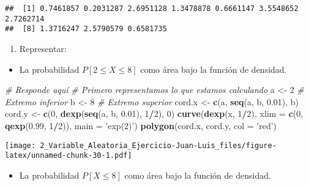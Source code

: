 \documentclass[
]{article}
\newenvironment{Shaded}{\begin{snugshade}}{\end{snugshade}}
\newcommand{\CommentTok}[1]{\textcolor[rgb]{0.56,0.35,0.01}{\textit{#1}}}
\newcommand{\DataTypeTok}[1]{\textcolor[rgb]{0.13,0.29,0.53}{#1}}
\newcommand{\DecValTok}[1]{\textcolor[rgb]{0.00,0.00,0.81}{#1}}
\newcommand{\FloatTok}[1]{\textcolor[rgb]{0.00,0.00,0.81}{#1}}
\newcommand{\KeywordTok}[1]{\textcolor[rgb]{0.13,0.29,0.53}{\textbf{#1}}}
\newcommand{\NormalTok}[1]{#1}
\newcommand{\OperatorTok}[1]{\textcolor[rgb]{0.81,0.36,0.00}{\textbf{#1}}}
\newcommand{\StringTok}[1]{\textcolor[rgb]{0.31,0.60,0.02}{#1}}
\providecommand{\tightlist}{%
  \setlength{\itemsep}{0pt}\setlength{\parskip}{0pt}}
\begin{document}
\begin{verbatim}
##  [1] 0.7461857 0.2031287 2.6951128 1.3478878 0.6661147 3.5548652 2.7262714
##  [8] 1.3716247 2.5790579 0.6581735
\end{verbatim}

\begin{enumerate}
\def\labelenumi{\arabic{enumi}.}
\setcounter{enumi}{3}
\tightlist
\item
  Representar:
\end{enumerate}

\begin{itemize}
\tightlist
\item
  La probabilidad \(P [2 \leq X \leq 8]\) como área bajo la función de
  densidad.
\end{itemize}

\begin{Shaded}
\begin{Highlighting}[]
\CommentTok{# Responde aquí}
\CommentTok{# Primero representamos lo que estamos calculando}
\NormalTok{a <-}\StringTok{ }\DecValTok{2} \CommentTok{# Extremo inferior}
\NormalTok{b <-}\StringTok{ }\DecValTok{8} \CommentTok{# Extremo superior}
\NormalTok{cord.x <-}\StringTok{ }\KeywordTok{c}\NormalTok{(a, }\KeywordTok{seq}\NormalTok{(a, b, }\FloatTok{0.01}\NormalTok{), b) }
\NormalTok{cord.y <-}\StringTok{ }\KeywordTok{c}\NormalTok{(}\DecValTok{0}\NormalTok{, }\KeywordTok{dexp}\NormalTok{(}\KeywordTok{seq}\NormalTok{(a, b, }\FloatTok{0.01}\NormalTok{), }\DecValTok{1}\OperatorTok{/}\DecValTok{2}\NormalTok{), }\DecValTok{0}\NormalTok{) }
\KeywordTok{curve}\NormalTok{(}\KeywordTok{dexp}\NormalTok{(x, }\DecValTok{1}\OperatorTok{/}\DecValTok{2}\NormalTok{), }\DataTypeTok{xlim =} \KeywordTok{c}\NormalTok{(}\DecValTok{0}\NormalTok{, }\KeywordTok{qexp}\NormalTok{(}\FloatTok{0.99}\NormalTok{, }\DecValTok{1}\OperatorTok{/}\DecValTok{2}\NormalTok{)), }\DataTypeTok{main =} \StringTok{'exp(2)'}\NormalTok{)}
\KeywordTok{polygon}\NormalTok{(cord.x, cord.y, }\DataTypeTok{col =} \StringTok{'red'}\NormalTok{)}
\end{Highlighting}
\end{Shaded}

\texttt{[image: 2\_Variable\_Aleatoria\_Ejercicio-Juan-Luis\_files/figure-latex/unnamed-chunk-30-1.pdf]}

\begin{itemize}
\tightlist
\item
  La probabilidad \(P [X \leq 8]\) como área bajo la función de
  densidad.
\end{itemize}
\end{document}
